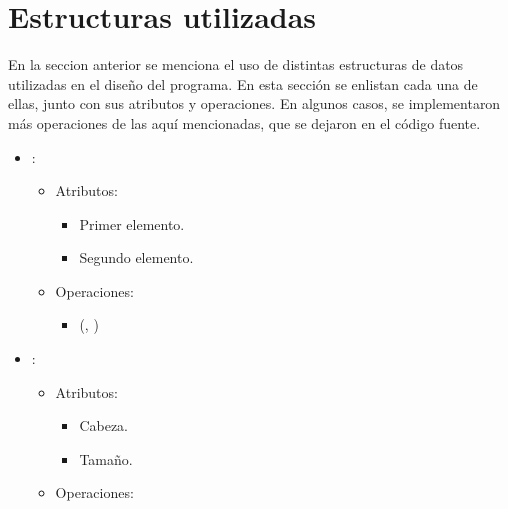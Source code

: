 \documentclass[11pt]{article}
\begin{document}
   \section{Estructuras utilizadas}

   En la seccion anterior se menciona el uso de distintas estructuras de datos
   utilizadas en el diseño del programa. En esta sección se enlistan cada una
   de ellas, junto con sus atributos y operaciones. En algunos casos, se implementaron
   más operaciones de las aquí mencionadas, que se dejaron en el código fuente.

   \begin{itemize}
      \item {}:
      \begin{itemize}
         \item Atributos:

         \begin{itemize}
            \item Primer elemento.
            \item Segundo elemento.
         \end{itemize}
      \end{itemize}
      
      \pagebreak

      \begin{itemize}
         \item Operaciones:

         \begin{itemize}
            \item {}(, )
         \end{itemize}
      \end{itemize}

      \item {}:

      \begin{itemize}
         \item Atributos:

         \begin{itemize}
            \item Cabeza.
            \item Tamaño.
         \end{itemize}
      \end{itemize}

      \begin{itemize}
         \item Operaciones:


\end{itemize}
\end{itemize}
\end{document}
